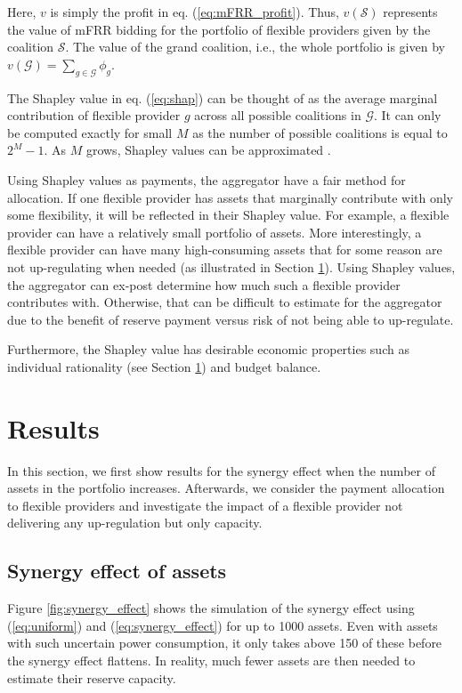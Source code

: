 \documentclass[lettersize,journal]{IEEEtran}
\begin{document}
Here, $v$ is simply the profit in eq. (\ref{eq:mFRR_profit}). Thus, $v(\mathcal{S})$ represents the value of mFRR bidding for the portfolio of flexible providers given by the coalition $\mathcal{S}$. The value of the grand coalition, i.e., the whole portfolio is given by $v(\mathcal{G}) = \sum_{g \in \mathcal{G}} \phi_{g}$.

The Shapley value  in eq. (\ref{eq:shap}) can be thought of as the average marginal contribution of flexible provider $g$ across all possible coalitions in $\mathcal{G}$. It can only be computed exactly for small $M$ as the number of possible coalitions is equal to $2^{M} - 1$. As $M$ grows, Shapley values can be approximated \cite{castro2009polynomial}.

Using Shapley values as payments, the aggregator have a fair method for allocation. If one flexible provider has assets that marginally contribute with only some flexibility, it will be reflected in their Shapley value. For example, a flexible provider can have a relatively small portfolio of assets. More interestingly, a flexible provider can have many high-consuming assets that for some reason are not up-regulating when needed (as illustrated in Section \ref{sec:Results}). Using Shapley values, the aggregator can ex-post determine how much such a flexible provider contributes with. Otherwise, that can be difficult to estimate for the aggregator due to the benefit of reserve payment versus risk of not being able to up-regulate.

Furthermore, the Shapley value has desirable economic properties such as individual rationality (see Section \ref{sec:Results}) and budget balance.

\section{Results}\label{sec:Results}

In this section, we first show results for the synergy effect when the number of assets in the portfolio increases. Afterwards, we consider the payment allocation to flexible providers and investigate the impact of a flexible provider not delivering any up-regulation but only capacity.

\subsection{Synergy effect of assets}

Figure \ref{fig:synergy_effect} shows the simulation of the synergy effect using (\ref{eq:uniform}) and (\ref{eq:synergy_effect}) for up to 1000 assets. Even with assets with such uncertain power consumption, it only takes above 150 of these before the synergy effect flattens. In reality, much fewer assets are then needed to estimate their reserve capacity.
\end{document}
